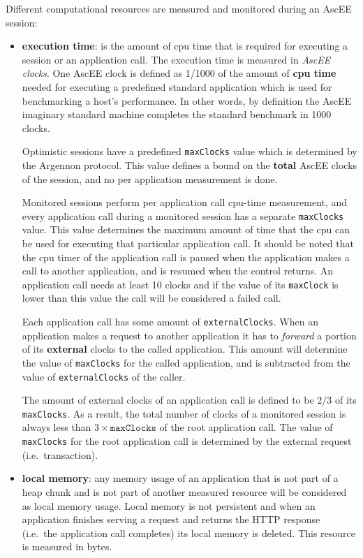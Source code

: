 Different computational resources are measured and monitored during an AscEE session:
\begin{itemize}
    \item \textbf{execution time}:
    is the amount of cpu time that is required for executing a session or an application call. The execution time is
    measured in \emph{AscEE clocks}. One AscEE clock is defined as 1/1000 of the amount
    of \textbf{cpu time} needed for executing a predefined standard application which is used for benchmarking a host's
    performance. In other words, by definition the AscEE imaginary standard machine completes the standard benchmark
    in 1000 clocks.

    Optimistic sessions have a predefined \texttt{maxClocks} value which is determined by the Argennon protocol. This
    value defines a bound on the \textbf{total} AscEE clocks of the session, and no per application measurement is done.

    Monitored sessions perform per application call cpu-time measurement, and every application call during a monitored
    session has a separate \texttt{maxClocks} value. This value determines the maximum amount of time that the cpu
    can be used for executing that particular application call. It should be noted that the cpu timer of the
    application call is paused when the application makes a call to another application, and is resumed when the
    control returns. An application call
    needs at least 10 clocks and if the value of its \texttt{maxClock} is lower than this value the call will be
    considered a failed call.

    Each application call has some amount of \texttt{externalClocks}. When an application makes a request to another
    application it has to \emph{forward} a portion of its \textbf{external} clocks to the called application. This
    amount will determine the value of \texttt{maxClocks} for the called application, and is subtracted from the value
    of \texttt{externalClocks} of the caller.

    The amount of external clocks of an application
    call is defined to be \(2/3\) of its \texttt{maxClocks}. As a result, the total number of clocks of a monitored
    session is always less than \(3 \times \texttt{maxClocks}\) of the root application call. The value of
    \texttt{maxClocks} for
    the root application call is determined by the external request (i.e.\ transaction).

    \item \textbf{local memory}:
    any memory usage of an application that is not part of a heap chunk and is not part of another measured resource
    will be considered as local memory usage. Local memory is not persistent and when an application finishes serving a
    request and returns the HTTP response (i.e.\ the application call completes) its local memory is deleted.
    This resource is measured in bytes.


\end{itemize}
